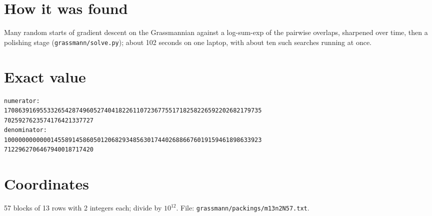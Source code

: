\documentclass[11pt,a4paper]{article}
\begin{document}
\section{How it was found}
Many random starts of gradient descent on the Grassmannian against a log-sum-exp of the pairwise overlaps, sharpened over time, then a polishing stage (\texttt{grassmann/solve.py}); about 102 seconds on one laptop, with about ten such searches running at once.


\appendix
\section{Exact value}
{\small
\begin{verbatim}
numerator:
170863916955332654287496052740418226110723677551718258226592202682179735
7025927623574176421337727
denominator:
100000000000014558914586050120682934856301744026886676019159461898633923
7122962706467940018717420
\end{verbatim}}

\section{Coordinates}
57 blocks of 13 rows with 2 integers each; divide by $10^{12}$. File: \texttt{grassmann/packings/m13n2N57.txt}.
{\tiny
\begin{multicols}{4}
\end{multicols}}
\end{document}
